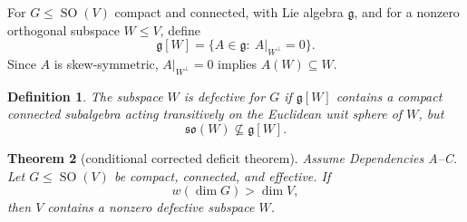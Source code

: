 \documentclass[11pt]{article}
\newtheorem{theorem}{Theorem}
\newtheorem{definition}[theorem]{Definition}
\theoremstyle{remark}
\newcommand{\fg}{\mathfrak g}
\newcommand{\so}{\mathfrak{so}}
\DeclareMathOperator{\SO}{SO}
\begin{document}
For \(G\leq\SO(V)\) compact and connected, with Lie algebra \(\fg\), and for
a nonzero orthogonal subspace \(W\leq V\), define
\[
 \fg[W]=\{A\in\fg:\ A|_{W^\perp}=0\}.
\]
Since \(A\) is skew-symmetric, \(A|_{W^\perp}=0\) implies \(A(W)\subseteq W\).

\begin{definition}
The subspace \(W\) is \emph{defective} for \(G\) if \(\fg[W]\) contains a
compact connected subalgebra acting transitively on the Euclidean unit sphere
of \(W\), but
\[
 \so(W)\not\subseteq \fg[W].
\]
\end{definition}

\begin{theorem}[conditional corrected deficit theorem]\label{thm:defective}
Assume Dependencies A--C.  Let \(G\leq\SO(V)\) be compact, connected, and
effective.  If
\[
 w(\dim G)>\dim V,
\]
then \(V\) contains a nonzero defective subspace \(W\).
\end{theorem}
\end{document}
